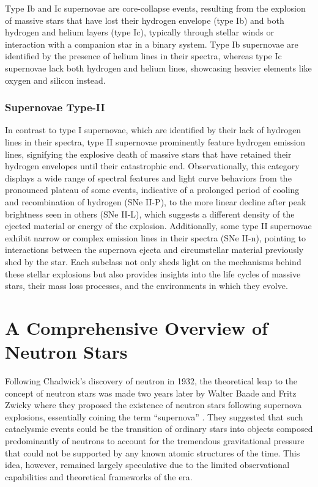 \documentclass[main.tex]{subfiles}
\begin{document}
    Type Ib and Ic supernovae are core-collapse events, resulting from the explosion of massive stars that have lost their hydrogen envelope (type Ib) and both hydrogen and helium layers (type Ic), typically through stellar winds or interaction with a companion star in a binary system. Type Ib supernovae are identified by the presence of helium lines in their spectra, whereas type Ic supernovae lack both hydrogen and helium lines, showcasing heavier elements like oxygen and silicon instead.
    \subsubsection{Supernovae Type-II}
    In contrast to type I supernovae, which are identified by their lack of hydrogen lines in their spectra, type II supernovae prominently feature hydrogen emission lines, signifying the explosive death of massive stars that have retained their hydrogen envelopes until their catastrophic end. Observationally, this category displays a wide range of spectral features and light curve behaviors from the pronounced plateau of some events, indicative of a prolonged period of cooling and recombination of hydrogen (SNe II-P), to the more linear decline after peak brightness seen in others (SNe II-L), which suggests a different density of the ejected material or energy of the explosion. Additionally, some type II supernovae exhibit narrow or complex emission lines in their spectra (SNe II-n), pointing to interactions between the supernova ejecta and circumstellar material previously shed by the star.  Each subclass not only sheds light on the mechanisms behind these stellar explosions but also provides insights into the life cycles of massive stars, their mass loss processes, and the environments in which they evolve.














    \section{A Comprehensive Overview of Neutron Stars}\label{sec:ch1:ns_struct}
    Following Chadwick's discovery of neutron in 1932, the theoretical leap to the concept of neutron stars was made two years later by Walter Baade and Fritz Zwicky where they proposed the existence of neutron stars following supernova explosions, essentially coining the term ``supernova'' \citep{PhysRev.46.76.2, 1934PNAS...20..259B, 1934PNAS...20..254B}. They suggested that such cataclysmic events could be the transition of ordinary stars into objects composed predominantly of neutrons to account for the tremendous gravitational pressure that could not be supported by any known atomic structures of the time. This idea, however, remained largely speculative due to the limited observational capabilities and theoretical frameworks of the era.
    
\end{document}
